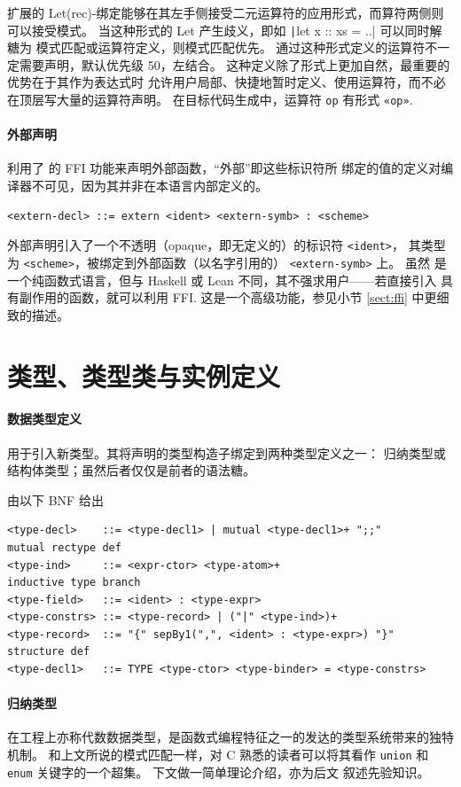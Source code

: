 扩展的 Let(rec)-绑定能够在其左手侧接受二元运算符的应用形式，而算符两侧则可以接受模式。
当这种形式的 Let 产生歧义，即如 \texttt|let x :: xs = ..| 可以同时解糖为
模式匹配或运算符定义，则模式匹配优先。
通过这种形式定义的运算符不一定需要声明，默认优先级 50，左结合。
这种定义除了形式上更加自然，最重要的优势在于其作为表达式时
允许用户局部、快捷地暂时定义、使用运算符，而不必在顶层写大量的运算符声明。
在目标代码生成中，运算符 \texttt{op} 有形式 \texttt{«op»}.

\paragraph{外部声明} 利用了 \Tigris 的 FFI 功能来声明外部函数，“外部”即这些标识符所
绑定的值的定义对编译器不可见，因为其并非在本语言内部定义的。
\begin{verbatim}
<extern-decl> ::= extern <ident> <extern-symb> : <scheme>
\end{verbatim}
外部声明引入了一个不透明（opaque，即无定义的）的标识符 \texttt{<ident>}，
其类型为 \texttt{<scheme>}，被绑定到外部函数（以名字引用的） \texttt{<extern-symb>} 上。
虽然 \Tigris 是一个纯函数式语言，但与 Haskell 或 Lean 不同，其不强求用户——若直接引入
具有副作用的函数，就可以利用 FFI. 这是一个高级功能，参见小节 \ref{sect:ffi} 中更细致的描述。

\section{类型、类型类与实例定义}
\paragraph{数据类型定义} 用于引入新类型。其将声明的类型构造子绑定到两种类型定义之一：
归纳类型或结构体类型；虽然后者仅仅是前者的语法糖。
\begin{definition}[类型声明] 由以下 BNF 给出
\begin{verbatim}
<type-decl>    ::= <type-decl1> | mutual <type-decl1>+ ";;"      mutual rectype def
<type-ind>     ::= <expr-ctor> <type-atom>+                      inductive type branch
<type-field>   ::= <ident> : <type-expr>
<type-constrs> ::= <type-record> | ("|" <type-ind>)+
<type-record>  ::= "{" sepBy1(",", <ident> : <type-expr>) "}"    structure def
<type-decl1>   ::= TYPE <type-ctor> <type-binder> = <type-constrs>
\end{verbatim}
\end{definition}
\paragraph{归纳类型} 在工程上亦称代数数据类型，是函数式编程特征之一的发达的类型系统带来的独特机制。
和上文所说的模式匹配一样，对 C 熟悉的读者可以将其看作 \texttt{union} 和 \texttt{enum} 关键字的一个超集。
下文做一简单理论介绍，亦为后文 \Tigrisd 叙述先验知识。

